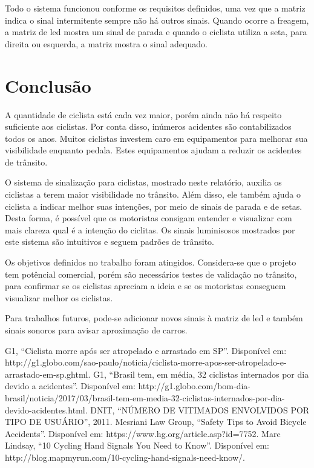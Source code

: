 \documentclass[conference]{IEEEtran}
\begin{document}
Todo o sistema funcionou conforme os requisitos definidos, uma vez que a matriz indica o sinal intermitente sempre não há outros sinais. Quando ocorre a freagem, a matriz de led mostra um sinal de parada e quando o ciclista utiliza a seta, para direita ou esquerda, a matriz mostra o sinal adequado.


\section{Conclusão}
A quantidade de ciclista está cada vez maior, porém ainda não há respeito suficiente aos ciclistas. Por conta disso, inúmeros acidentes são contabilizados todos os anos. Muitos ciclistas investem caro em equipamentos para melhorar sua visibilidade enquanto pedala. Estes equipamentos ajudam a reduzir os acidentes de trânsito.

O sistema de sinalização para ciclistas, mostrado neste relatório, auxilia os ciclistas a terem maior visibilidade no trânsito. Além disso, ele também ajuda o ciclista a indicar melhor suas intenções, por meio de sinais de parada e de setas. Desta forma, é possível que os motoristas consigam entender e visualizar com mais clareza qual é a intenção do ciclitas. Os sinais luminisosos mostrados por este sistema são intuitivos e seguem padrões de trânsito.

Os objetivos definidos no trabalho foram atingidos. Considera-se que o projeto tem potêncial comercial, porém são necessários testes de validação no trânsito, para confirmar se os ciclistas apreciam a ideia e se os motoristas conseguem visualizar melhor os ciclistas. 

Para trabalhos futuros, pode-se adicionar novos sinais à matriz de led e também sinais sonoros para avisar aproximação de carros. 


\begin{thebibliography}{00}
   G1, ``Ciclista morre após ser atropelado e arrastado em SP''. Disponível em: http://g1.globo.com/sao-paulo/noticia/ciclista-morre-apos-ser-atropelado-e-arrastado-em-sp.ghtml.
   G1, ``Brasil tem, em média, 32 ciclistas internados por dia devido a acidentes''. Disponível em: http://g1.globo.com/bom-dia-brasil/noticia/2017/03/brasil-tem-em-media-32-ciclistas-internados-por-dia-devido-acidentes.html.
   DNIT, ``NÚMERO DE VITIMADOS ENVOLVIDOS POR TIPO DE USUÁRIO'', 2011.
   Mesriani Law Group, ``Safety Tips to Avoid Bicycle Accidents''. Disponível em: https://www.hg.org/article.asp?id=7752.
   Marc Lindsay, ``10 Cycling Hand Signals You Need to Know''. Disponível em: http://blog.mapmyrun.com/10-cycling-hand-signals-need-know/.

\end{thebibliography}


\end{document}
